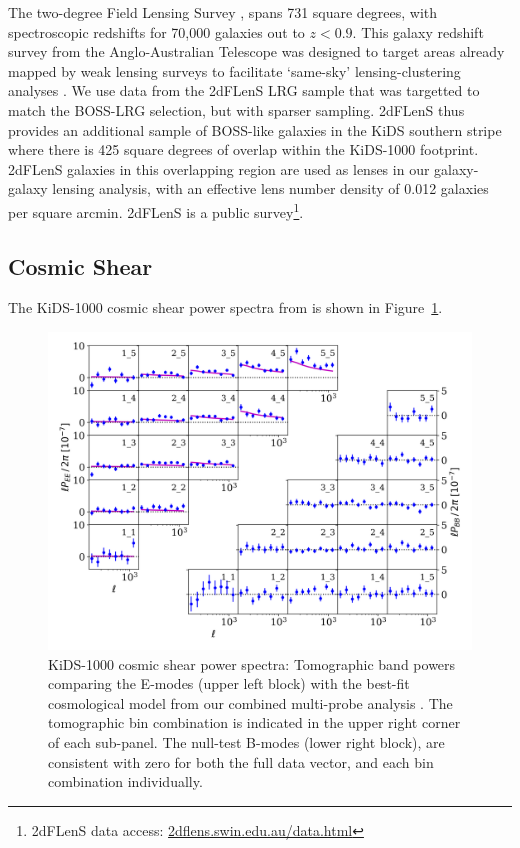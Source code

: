 The two-degree Field Lensing Survey
\citep[2dFLenS,][]{blake/etal:2016}, spans 731 square degrees, with
spectroscopic redshifts for 70,000 galaxies out to $z<0.9$.   This
galaxy redshift survey from the Anglo-Australian Telescope was designed
to target areas already mapped by weak lensing surveys to facilitate `same-sky'
lensing-clustering analyses
\citep{johnson/etal:2017,amon/etal:2018,joudaki/etal:2018}.
We use data from the 2dFLenS LRG sample that was targetted to match
the BOSS-LRG selection, but with sparser sampling.  2dFLenS
thus provides an additional sample of BOSS-like galaxies in the KiDS
southern stripe where there is 425 square degrees of overlap within
the KiDS-1000 footprint.  2dFLenS galaxies in this overlapping region are used as lenses in
our galaxy-galaxy lensing analysis, with an effective lens number density of 0.012
galaxies per square arcmin.  2dFLenS is a public survey\footnote{2dFLenS data
  access: \href{http://2dflens.swin.edu.au/data.html}{2dflens.swin.edu.au/data.html}}.   




\subsection{Cosmic Shear}
\label{sec:cosmic_shear}
The KiDS-1000 cosmic shear power spectra from \citet{asgari/etal:inprep} is shown in Figure~\ref{fig:Pkk}.

\begin{figure}
        \includegraphics[width=\textwidth]{Data_Plots/Pkk/Pkk_K1000_2Dbins_v2_goldclasses_Flag_SOM_Fid.png}
        \caption{KiDS-1000 cosmic shear power spectra:  Tomographic
          band powers comparing the E-modes (upper left block) with the best-fit
          cosmological model from our combined multi-probe analysis
          .  The tomographic
        bin combination is indicated in the upper right corner of each
      sub-panel.  The null-test B-modes (lower right block), are
      consistent with zero for both the full data vector, and each
     bin combination individually.}
        \label{fig:Pkk}
\end{figure}

